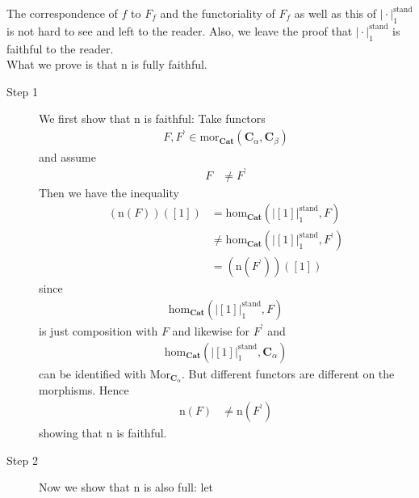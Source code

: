 \begin{prf}
The correspondence of $f$ to $F_{f}$ and the functoriality of $F_{f}$ as well as this of $\vert \cdot \vert_{1}^{\textrm{stand}}$ is not hard to see and left to the reader. Also, we leave the proof that $\vert \cdot \vert_{1}^{\textrm{stand}}$ is faithful to the reader.
\\
What we prove is that $\mathrm{n}$ is fully faithful.
\begin{description}
\item[Step 1]
We first show that $\mathrm{n}$ is faithful: Take functors
\begin{align*}
  F,
  F^{\backprime}
  \in
  \mathrm{mor}_{\mathbf{Cat}}
  \left(
    \mathbf{C}_{\alpha},
    \mathbf{C}_{\beta}
  \right)
\end{align*}
and assume
\begin{align*}
  F
  &\neq
  F^{\backprime}
\end{align*}
Then we have the inequality
\begin{align*}
  (\mathrm{n}(F))
  \left(
    [1]
  \right)
  &=
  \mathrm{hom}_{\mathbf{Cat}}
  \left(
    \left\vert
      [1]
    \right\vert_{1}^{\textrm{stand}},
    F
  \right)
  \\
  &\neq
  \mathrm{hom}_{\mathbf{Cat}}
  \left(
    \left\vert
      [1]
    \right\vert_{1}^{\textrm{stand}},
    F^{\backprime}
  \right)
  \\
  &=
  \left(
    \mathrm{n}(F^{\backprime})
  \right)
  \left(
    [1]
  \right)
\end{align*}
since
\begin{align*}
  \mathrm{hom}_{\mathbf{Cat}}
  \left(
    \left\vert
      [1]
    \right\vert_{1}^{\textrm{stand}},
    F
  \right)
\end{align*}
is just composition with $F$ and likewise for $F^{\backprime}$ and
\begin{align*}
  \mathrm{hom}_{\mathbf{Cat}}
  \left(
    \left\vert
      [1]
    \right\vert_{1}^{\textrm{stand}},
    \mathbf{C}_{\alpha}
  \right)
\end{align*}
can be identified with $\mathrm{Mor}_{\mathbf{C}_{\alpha}}$. But different functors are different on the morphisms. Hence
\begin{align*}
  \mathrm{n}(F)
  &\neq
  \mathrm{n}
  \left(
    F^{\backprime}
  \right)
\end{align*}
showing that $\mathrm{n}$ is faithful.
\item[Step 2]
Now we show that $\mathrm{n}$ is also full: let
\begin{align*}

\end{align*}
\end{description}
\end{prf}
